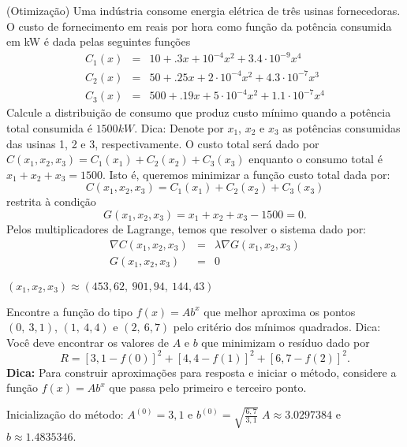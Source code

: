 \begin{exer}(Otimização)\label{nlinsis:usinas} Uma indústria consome energia elétrica de três usinas fornecedoras. O custo de fornecimento em reais por hora como função da potência consumida em kW é dada pelas seguintes funções
\begin{eqnarray}
C_1(x)&=&10+.3x+10^{-4}x^2+3.4\cdot 10^{-9}x^4\\
C_2(x)&=&50+.25x+2\cdot 10^{-4}x^2+4.3\cdot 10^{-7}x^3\\
C_3(x)&=&500+.19x+5\cdot 10^{-4}x^2+1.1\cdot 10^{-7}x^4
\end{eqnarray}
Calcule a distribuição de consumo que produz custo mínimo quando a potência total consumida é $1500kW$. Dica: Denote por $x_1$, $x_2$ e $x_3$ as potências consumidas das usinas 1, 2 e 3, respectivamente.  O custo total será dado por $C(x_1,x_2,x_3)=C_1(x_1)+C_2(x_2)+C_3(x_3)$ enquanto o consumo total é $x_1+x_2+x_3=1500$. Isto é, queremos minimizar a função custo total dada por:
\begin{equation} C(x_1,x_2,x_3)=C_1(x_1)+C_2(x_2)+C_3(x_3) \end{equation}
restrita à condição
\begin{equation} G(x_1,x_2,x_3)=x_1+x_2+x_3-1500=0. \end{equation}
Pelos multiplicadores de Lagrange, temos que resolver o sistema dado por:
\begin{eqnarray}
\nabla C(x_1,x_2,x_3) &=& \lambda \nabla G(x_1,x_2,x_3)\\
G(x_1,x_2,x_3)&=&0
\end{eqnarray}
\end{exer}
\begin{resp}
 $(x_1,x_2,x_3)\approx (453,62,~ 901,94,~ 144,43)$
\end{resp}


\begin{exer} \label{nlinsis:prob_ajuste_eax} Encontre a função do tipo $f(x)=Ab^{x}$ que melhor aproxima os pontos $(0,~3,1)$, $(1,~4,4)$ e $(2,~6,7)$ pelo critério dos mínimos quadrados. Dica: Você deve encontrar os valores de $A$ e $b$ que minimizam o resíduo dado por
\begin{equation} R=\left[3,1-f(0)\right]^2+\left[4,4-f(1)\right]^2+\left[6,7-f(2)\right]^2. \end{equation}
{\bf Dica:} Para construir aproximações para resposta e iniciar o método, considere a função $f(x)=Ab^x$ que passa pelo primeiro e terceiro ponto.
\end{exer}
\begin{resp}
Inicialização do método: $A^{(0)}= 3,1$ e $b^{(0)}= \sqrt{\frac{6,7}{3,1}}$
$A\approx  3.0297384 $ e $b\approx 1.4835346$.
\end{resp}


